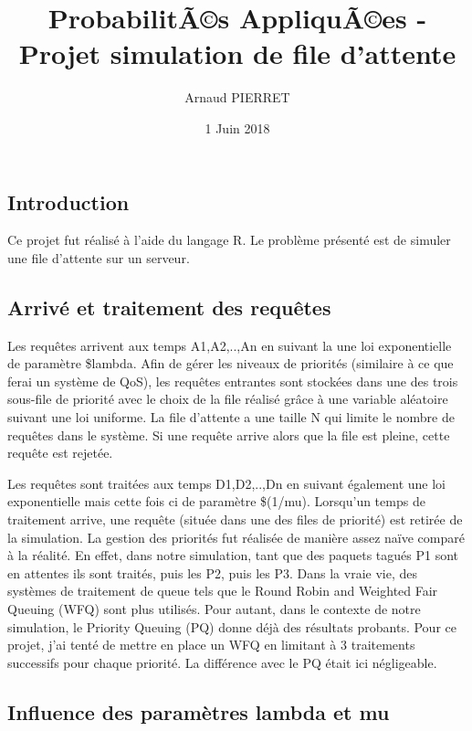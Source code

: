\documentclass[]{article}
\title{ProbabilitÃ©s AppliquÃ©es - Projet simulation de file d'attente}
\author{Arnaud PIERRET}
\date{1 Juin 2018}
\begin{document}
\maketitle

\subsection{Introduction}\label{introduction}

Ce projet fut réalisé à l'aide du langage R. Le problème présenté est de
simuler une file d'attente sur un serveur.

\subsection{Arrivé et traitement des
requêtes}\label{arrive-et-traitement-des-requetes}

Les requêtes arrivent aux temps A1,A2,..,An en suivant la une loi
exponentielle de paramètre \$lambda. Afin de gérer les niveaux de
priorités (similaire à ce que ferai un système de QoS), les requêtes
entrantes sont stockées dans une des trois sous-file de priorité avec le
choix de la file réalisé grâce à une variable aléatoire suivant une loi
uniforme. La file d'attente a une taille N qui limite le nombre de
requêtes dans le système. Si une requête arrive alors que la file est
pleine, cette requête est rejetée.

Les requêtes sont traitées aux temps D1,D2,..,Dn en suivant également
une loi exponentielle mais cette fois ci de paramètre \$(1/mu).
Lorsqu'un temps de traitement arrive, une requête (située dans une des
files de priorité) est retirée de la simulation. La gestion des
priorités fut réalisée de manière assez naïve comparé à la réalité. En
effet, dans notre simulation, tant que des paquets tagués P1 sont en
attentes ils sont traités, puis les P2, puis les P3. Dans la vraie vie,
des systèmes de traitement de queue tels que le Round Robin and Weighted
Fair Queuing (WFQ) sont plus utilisés. Pour autant, dans le contexte de
notre simulation, le Priority Queuing (PQ) donne déjà des résultats
probants. Pour ce projet, j'ai tenté de mettre en place un WFQ en
limitant à 3 traitements successifs pour chaque priorité. La différence
avec le PQ était ici négligeable.

\subsection{Influence des paramètres lambda et
mu}\label{influence-des-parametres-lambda-et-mu}
\end{document}
